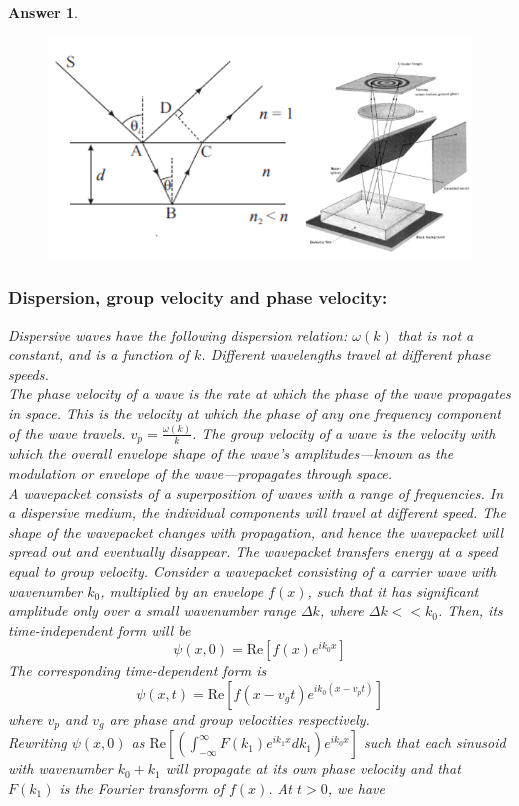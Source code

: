 \documentclass[a4paper]{article}
\newtheorem{ans}{Answer}[subsection]
\theoremstyle{new}
\begin{document}
\begin{ans}
\begin{figure}[H]
\centering
\includegraphics[width=\linewidth]{thinfilm.PNG}
\end{figure}
\newpage
\subsubsection*{Dispersion, group velocity and phase velocity:}
Dispersive waves have the following dispersion relation: $\omega(k)$ that is not a constant, and is a function of $k$. Different wavelengths travel at different phase speeds.\\[5pt]
The phase velocity of a wave is the rate at which the phase of the wave propagates in space. This is the velocity at which the phase of any one frequency component of the wave travels. $v_p=\frac{\omega(k)}{k}$. The group velocity of a wave is the velocity with which the overall envelope shape of the wave's amplitudes—known as the modulation or envelope of the wave—propagates through space.\\[5pt]
A wavepacket consists of a superposition of waves with a range of frequencies. In a dispersive medium, the individual components will travel at different speed. The shape of the wavepacket changes with propagation, and hence the wavepacket will spread out and eventually disappear. The wavepacket transfers energy at a speed equal to group velocity. Consider a wavepacket consisting of a carrier wave with wavenumber $k_0$, multiplied by an envelope $f(x)$, such that it has significant amplitude only over a small wavenumber range $\Delta k$, where $\Delta k<<k_0$. Then, its time-independent form will be
$$\psi(x,0)=\text{Re}[f(x)e^{ik_0x}]$$
The corresponding time-dependent form is
$$\psi(x,t)=\text{Re}[f(x-v_gt)e^{ik_0(x-v_pt)}]$$
where $v_p$ and $v_g$ are phase and group velocities respectively.\\[5pt]
Rewriting $\psi(x,0)$ as $\text{Re}[(\int_{-\infty}^\infty F(k_1)e^{ik_1x}dk_1)e^{ik_0x}]$ such that each sinusoid with wavenumber $k_0+k_1$ will propagate at its own phase velocity and that $F(k_1)$ is the Fourier transform of $f(x)$. At $t>0$, we have

\end{ans}
\end{document}
